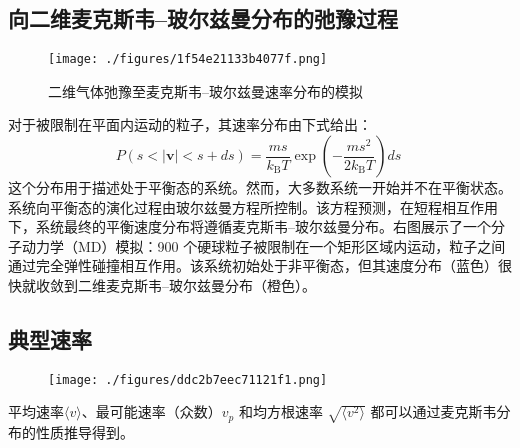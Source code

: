 \subsection{向二维麦克斯韦–玻尔兹曼分布的弛豫过程}
\begin{figure}[ht]
\centering
\texttt{[image: ./figures/1f54e21133b4077f.png]}
\caption{二维气体弛豫至麦克斯韦–玻尔兹曼速率分布的模拟} \label{fig_MKBR_2}
\end{figure}
对于被限制在平面内运动的粒子，其速率分布由下式给出：
$$
P(s < |\mathbf{v}| < s + ds) = \frac{m s}{k_{\text{B}} T} \exp\left( -\frac{m s^2}{2 k_{\text{B}} T} \right) ds~
$$
这个分布用于描述处于平衡态的系统。然而，大多数系统一开始并不在平衡状态。系统向平衡态的演化过程由玻尔兹曼方程所控制。该方程预测，在短程相互作用下，系统最终的平衡速度分布将遵循麦克斯韦–玻尔兹曼分布。右图展示了一个分子动力学（MD）模拟：900 个硬球粒子被限制在一个矩形区域内运动，粒子之间通过完全弹性碰撞相互作用。该系统初始处于非平衡态，但其速度分布（蓝色）很快就收敛到二维麦克斯韦–玻尔兹曼分布（橙色）。
\subsection{典型速率}
\begin{figure}[ht]
\centering
\texttt{[image: ./figures/ddc2b7eec71121f1.png]}
\caption{} \label{fig_MKBR_3}
\end{figure}
平均速率$\langle v \rangle$、最可能速率（众数）$v_p$ 和均方根速率 $\sqrt{ \langle v^2 \rangle }$ 都可以通过麦克斯韦分布的性质推导得到。

